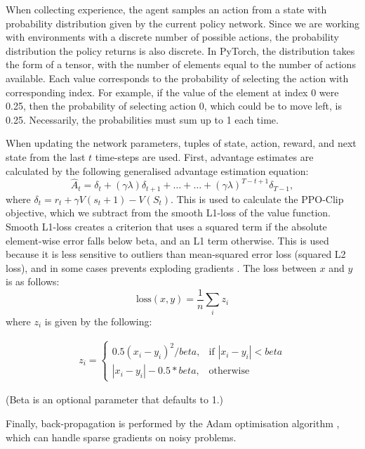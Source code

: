 \documentclass[12pt,a4paper]{article}
\begin{document}
When collecting experience, the agent samples an action from a state with probability distribution given by the current policy network. Since we are working with environments with a discrete number of possible actions, the probability distribution the policy returns is also discrete. In PyTorch, the distribution takes the form of a tensor, with the number of elements equal to the number of actions available. Each value corresponds to the probability of selecting the action with corresponding index. For example, if the value of the element at index 0 were 0.25, then the probability of selecting action 0, which could be to move left, is 0.25. Necessarily, the probabilities must sum up to 1 each time.

When updating the network parameters, tuples of state, action, reward, and next state from the last $t$ time-steps are used. First, advantage estimates are calculated by the following generalised advantage estimation equation: $$\hat{A}_t = \delta_t + (\gamma\lambda)\delta_{t+1} + \dots + \dots + (\gamma\lambda)^{T-t+1}\delta_{T-1},$$ where $\delta_t = r_t + \gamma V(s_t+1) - V(S_t)$. This is used to calculate the PPO-Clip objective, which we subtract from the smooth L1-loss of the value function. Smooth L1-loss creates a criterion that uses a squared term if the absolute element-wise error falls below beta, and an L1 term otherwise. This is used because it is less sensitive to outliers than mean-squared error loss (squared L2 loss), and in some cases prevents exploding gradients \cite{girshick2015fast}. The loss between $x$ and $y$ is as follows: $$\text{loss}(x, y) = \frac{1}{n} \sum_{i} z_{i}$$ where $z_i$ is  given by the following:

\[\begin{aligned}
z_{i} =
\begin{cases}
0.5 (x_i - y_i)^2 / beta, & \text{if } |x_i - y_i| < beta \\
|x_i - y_i| - 0.5 * beta, & \text{otherwise }
\end{cases}
\end{aligned}\]

(Beta is an optional parameter that defaults to 1.)

Finally, back-propagation is performed by the Adam optimisation algorithm \cite{kingma2017adam}, which can handle sparse gradients on noisy problems.
\end{document}
